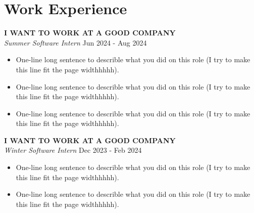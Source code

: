 \section{Work Experience}
\textbf{I WANT TO WORK AT A GOOD COMPANY}\\
\emph{Summer Software Intern} \hfill Jun 2024 - Aug 2024
\begin{itemize}
    \item One-line long sentence to describle what you did on this role (I try to make this line fit the page widthhhhh).
    \item One-line long sentence to describle what you did on this role (I try to make this line fit the page widthhhhh).    %
    \item One-line long sentence to describle what you did on this role (I try to make this line fit the page widthhhhh).    %
\end{itemize}

\textbf{I WANT TO WORK AT A GOOD COMPANY}\\
\emph{Winter Software Intern} \hfill Dec 2023 - Feb 2024
\begin{itemize}
    \item One-line long sentence to describle what you did on this role (I try to make this line fit the page widthhhhh).
    \item One-line long sentence to describle what you did on this role (I try to make this line fit the page widthhhhh).
\end{itemize}
